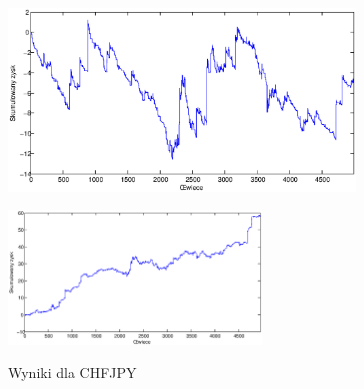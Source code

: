\begin{figure}[h]
\begin{minipage}{.49\linewidth}
\centering
\includegraphics[width=0.82\textwidth]{images/S1d_chfjpy.eps}
\label{mansard}
\end{minipage}
\begin{minipage}{\linewidth}
\centering
\includegraphics[width=0.6\textwidth]{images/S1s_chfjpy.eps}
\label{mansard}
\end{minipage}
\caption{Wyniki dla CHFJPY}
\end{figure}
\FloatBarrier
